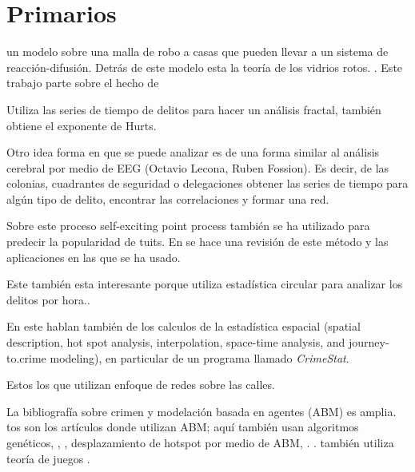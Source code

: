 \documentclass[onecolumn,12pt,letterpaper]{article}
\begin{document}
\section{Primarios}

un modelo sobre una malla de robo a casas que pueden llevar a un sistema de reacción-difusión. Detrás de este modelo esta la teoría de los vidrios rotos. \cite{short_statistical_2008}. Este trabajo parte sobre el hecho de 


Utiliza las series de tiempo de delitos para hacer un análisis fractal, también obtiene el exponente de Hurts\cite{melgarejo_multifractal_2017}.  


Otro idea forma en que se puede analizar es de una forma similar al análisis cerebral por medio de EEG (Octavio Lecona, Ruben Fossion). Es decir, de las colonias, cuadrantes de seguridad o delegaciones obtener las series de tiempo para algún tipo de delito, encontrar las correlaciones y formar una red. 



Sobre este proceso self-exciting point process también se ha utilizado para predecir la popularidad de tuits\cite{zhao2015seismic}. En \cite{reinhart2018review} se hace una revisión de este método y las aplicaciones en las que se ha usado. 

Este también esta interesante porque utiliza estadística circular para analizar los delitos por hora.\cite{brunsdon2006using}.


En este hablan también de los calculos de la estadística espacial (spatial description, hot spot analysis, interpolation, space-time analysis, and journey-to.crime modeling), en particular de un programa llamado \textit{CrimeStat}\cite{levine2006crime}.

Estos los que utilizan enfoque de redes sobre las calles\cite{rosser_predictive_2017}. \cite{porta_network_2006} \cite{porta_network_2006-1} \cite{davies_modelling_2013}

La bibliografía sobre crimen y modelación basada en agentes (ABM) es amplia. tos son los artículos donde utilizan ABM; aquí también usan algoritmos genéticos\cite{furtado_bio-inspired_2009}, \cite{malleson_agent-based_2009}, \cite{malleson_crime_2010} , desplazamiento de hotspot por medio de ABM\cite{wang_analyzing_2014}, \cite{devia_generating_2013}. \cite{hegemann_geographical_2011}. \cite{groff_simulation_2007} también utiliza teoría de juegos  \cite{bruni_what_2013}.
\end{document}
